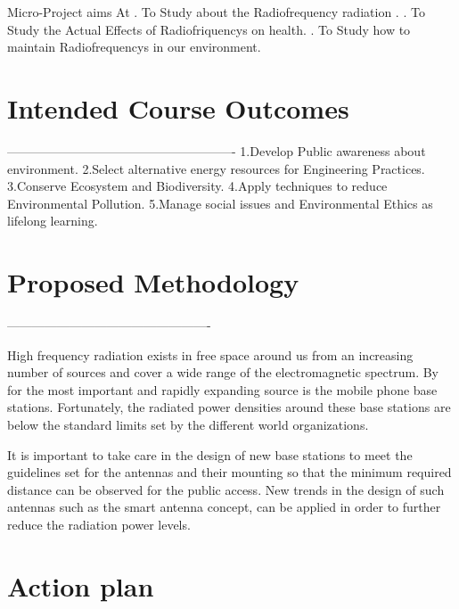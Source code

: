 \documentclass{article}
\begin{document}
 Micro-Project aims At
.	To Study about the Radiofrequency radiation .
. To Study the Actual Effects of Radiofriquencys on health.
. To Study how to maintain Radiofrequencys in our environment.

\section{	Intended Course Outcomes}

-------------------------------------------------------
\newline 1.Develop Public awareness about environment.
\newline 2.Select alternative energy resources for Engineering Practices.
\newline 3.Conserve Ecosystem and Biodiversity.
\newline 4.Apply techniques to reduce Environmental Pollution.
\newline 5.Manage social issues and Environmental Ethics as lifelong learning. 


\section{Proposed Methodology}

-------------------------------------------------

High frequency radiation exists in free space around us from an increasing number of sources
and cover a wide range of the electromagnetic spectrum. By for the most important and
rapidly expanding source is the mobile phone base stations. Fortunately, the radiated power
densities around these base stations are below the standard limits set by the different world
organizations. 

It is important to take care in the design of new base stations to meet the
guidelines set for the antennas and their mounting so that the minimum required distance can
be observed for the public access. New trends in the design of such antennas such as the
smart antenna concept, can be applied in order to further reduce the radiation power levels.




\section{ Action plan}
\end{document}
